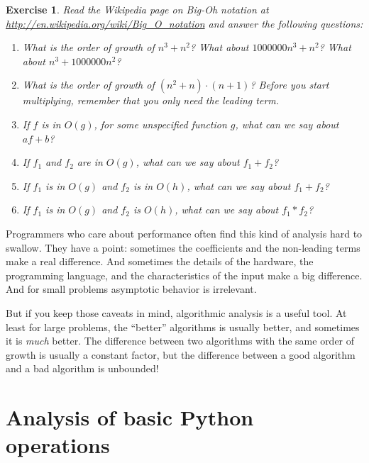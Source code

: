 \documentclass[12pt]{book}
\theoremstyle{exercise}
\newtheorem{exercise}{Exercise}[chapter]
\begin{document}
\begin{exercise}

Read the Wikipedia page on Big-Oh notation at
\url{http://en.wikipedia.org/wiki/Big_O_notation} and
answer the following questions:

\begin{enumerate}

\item What is the order of growth of $n^3 + n^2$?
What about $1000000 n^3 + n^2$?
What about $n^3 + 1000000 n^2$?

\item What is the order of growth of $(n^2 + n) \cdot (n + 1)$?  Before
  you start multiplying, remember that you only need the leading term.

\item If $f$ is in $O(g)$, for some unspecified function $g$, what can
  we say about $a f + b$?

\item If $f_1$ and $f_2$ are in $O(g)$, what can we say about $f_1 + f_2$?

\item If  $f_1$ is in $O(g)$
and $f_2$ is in $O(h)$,
what can we say about  $f_1 + f_2$?

\item If  $f_1$ is in $O(g)$ and $f_2$ is $O(h)$,
what can we say about  $f_1 * f_2$?

\end{enumerate}

\end{exercise}


Programmers who care about performance often find this kind of
analysis hard to swallow.  They have a point: sometimes the
coefficients and the non-leading terms make a real difference.  And
sometimes the details of the hardware, the programming language, and
the characteristics of the input make a big difference.  And for small
problems asymptotic behavior is irrelevant.

But if you keep those caveats in mind, algorithmic analysis is a
useful tool.  At least for large problems, the ``better'' algorithms
is usually better, and sometimes it is {\em much} better.  The
difference between two algorithms with the same order of growth is
usually a constant factor, but the difference between a good algorithm
and a bad algorithm is unbounded!


\section{Analysis of basic Python operations}
\end{document}
